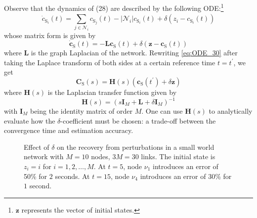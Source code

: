 \documentclass[journal]{IEEEtran}
\newcommand{\vet}[1]{\mathbf{#1}}
\newcommand{\mol}[1]{\ensuremath{\textrm{#1}}}
\begin{document}
{{Observe that the dynamics of (28)} are described by the following ODE:\footnote{{$\vet{z}$ represents the vector of initial states.}}
\begin{equation}\label{eq:ODE_0_28}
{\dot c_{{\mol{S}_i}}} (t)=  {\sum\limits_{j \in {\mathcal{N}_i}}^{} {{c_{{\mol{S}_j}}}}(t)} -  {|\mathcal N_i|}{c_{\mol{S}_i}}(t)  + \delta \left(z_i - {c_{\mol{S}_i}}(t) \right)
\end{equation}
whose matrix form is given by
\begin{equation}\label{eq:ODE_30}
{\dot {\mathbf{c}}_{{\mol{S}}}} (t)=  -{\mathbf{L}}{{\mathbf{c}}_{{\mol{S}}}} (t) + {\delta}\left(\mathbf{z}- {{\mathbf{c}}_{{\mol{S}}}} (t)\right)
\end{equation}
where $\mathbf{L}$ is the graph Laplacian of the network. Rewriting \eqref{eq:ODE_30} after taking the Laplace transform of both sides at a certain reference time $t=t^\prime$, we get
\begin{equation}\label{eq:ODE_31}
{ {\mathbf{C}}_{{\mol{S}}}} (s)=  {\mathbf{H}(s)}\left({{{\mathbf{c}}_{{\mol{S}}}} (t^\prime) + \delta \mathbf{z}}\right)
\end{equation}
where ${\mathbf{H}(s)}$ is the Laplacian transfer function given by
\begin{equation}\label{eq:H_32}
{\mathbf{H}(s)} = \left(s\mathbf{I}_M + {\mathbf{L}} + \delta\mathbf{I}_M\right)^{-1}
\end{equation}
with $\mathbf{I}_M$ being the identity matrix of order $M$. One can use ${\mathbf{H}(s)}$ to analytically evaluate how the $\delta$-coefficient must be chosen: a trade-off between the convergence time and estimation accuracy.









}


\begin{figure}[t]
 \centering
\caption{{Effect of $\delta$ on the recovery from perturbations in a small world network with $M=10$ nodes, $3M= 30$ links. The initial state is $z_i=i$ for $i=1,2,\ldots,M$. At $t=5$, node $\nu_1$ introduces an error of 50\% for $2$ seconds. At $t=15$, node $\nu_4$ introduces an error of 30\% for $1$ second.}}
\label{fig:errFast}
\end{figure}
\end{document}
